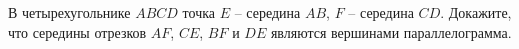 \begin{ex}
	\begin{condition}
		В четырехугольнике \( ABCD  \) точка \( E \) – середина \( AB \), \( F\) – середина \( CD \). Докажите, что середины отрезков \( AF \), \( CE \), \( BF  \) и \( DE  \) являются вершинами параллелограмма.
	\end{condition}
\end{ex}